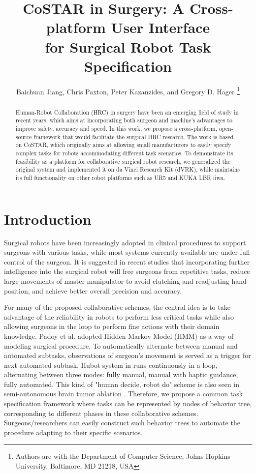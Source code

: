 \documentclass[letterpaper, 10 pt, conference]{ieeeconf}
\title{\huge \bf
CoSTAR in Surgery: A Cross-platform User Interface \\for Surgical Robot Task Specification
}
\author{Baichuan Jiang, Chris Paxton, Peter Kazanzides, and Gregory D. Hager
\thanks{Authors are with the Department of Computer Science, Johns Hopkins University,
        Baltimore, MD 21218, USA}
}
\begin{document}
\maketitle
\thispagestyle{empty}
\pagestyle{empty}


\begin{abstract}

Human-Robot Collaboration (HRC) in surgery have been an emerging field of study in recent years, which aims at incorporating both surgeon and machine’s advantages to improve safety, accuracy and speed. In this work, we propose a cross-platform, open-source framework that would facilitate the surgical HRC research. The work is based on CoSTAR, which originally aims at allowing small manufacturers to easily specify complex tasks for robots accommodating different task scenarios. To demonstrate its feasibility as a platform for collaborative surgical robot research, we generalized the original system and implemented it on da Vinci Research Kit (dVRK), while maintains its full functionality on other robot platforms such as UR5 and KUKA LBR iiwa.  

\end{abstract}


\section{Introduction}

Surgical robots have been increasingly adopted in clinical procedures to support surgeons with various tasks, while most systems currently available are under full control of the surgeon. It is suggested in recent studies \cite{padoy2011human,berthet2016hubot,bauzano2016collaborative,hu2015semi} that incorporating further intelligence into the surgical robot will free surgeons from repetitive tasks, reduce large movements of master manipulator to avoid clutching and readjusting hand position, and achieve better overall precision and accuracy. 

For many of the proposed collaborative schemes, the central idea is to take advantage of the reliability in robots to perform less critical tasks while also allowing surgeons in the loop to perform fine actions with their domain knowledge. Padoy et al. \cite{padoy2011human} adopted Hidden Markov Model (HMM) as a way of modeling surgical procedure. To automatically alternate between manual and automated subtasks, observations of surgeon’s movement is served as a trigger for next automated subtask. Hubot system in \cite{berthet2016hubot} runs continuously in a loop, alternating between three modes: fully manual, manual with haptic guidance, fully automated. This kind of "human decide, robot do" scheme is also seen in semi-autonomous brain tumor ablation \cite{hu2015semi}.  Therefore, we propose a common task specification framework where tasks can be represented by nodes of behavior tree, corresponding to different phases in these collaborative schemes. Surgeons/researchers can easily construct such  behavior trees to automate the procedure adapting to their specific scenarios. 
\end{document}
